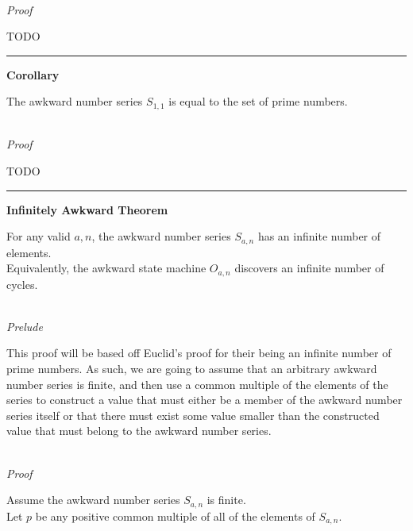 \documentclass[a4paper,12pt]{article}
\begin{document}
\noindent \\
\textit{Proof}

TODO

\begin{center}
\noindent\rule{8cm}{0.4pt}
\end{center}



\label{corollay:prime_asm}
\hypertarget{corollay:prime_asm}{}
\begin{tcolorbox}
\textbf{Corollary}

The awkward number series $S_{1, 1}$ is equal to the set of prime numbers.
\end{tcolorbox}

\noindent \\
\textit{Proof}

TODO

\begin{center}
\noindent\rule{8cm}{0.4pt}
\end{center}




\label{theorem:infinite_cycles}
\hypertarget{theorem:infinite_cycles}{}
\begin{tcolorbox}
\textbf{Infinitely Awkward Theorem}

For any valid $a, n$, the awkward number series $S_{a,n}$ has an infinite number of elements.\\

Equivalently, the awkward state machine $O_{a,n}$ discovers an infinite number of cycles.
\end{tcolorbox}

\noindent \\
\textit{Prelude}

\noindent This proof will be based off Euclid's proof for their being an infinite number of prime numbers. As such, we are going to assume that an arbitrary awkward number series is finite, and then use a common multiple of the elements of the series to construct a value that must either be a member of the awkward number series itself or that there must exist some value smaller than the constructed value that must belong to the awkward number series.

\noindent \\
\textit{Proof}

\noindent Assume the awkward number series $S_{a,n}$ is finite.\\

\noindent Let $p$ be any positive common multiple of all of the elements of $S_{a,n}$.\\
\end{document}
